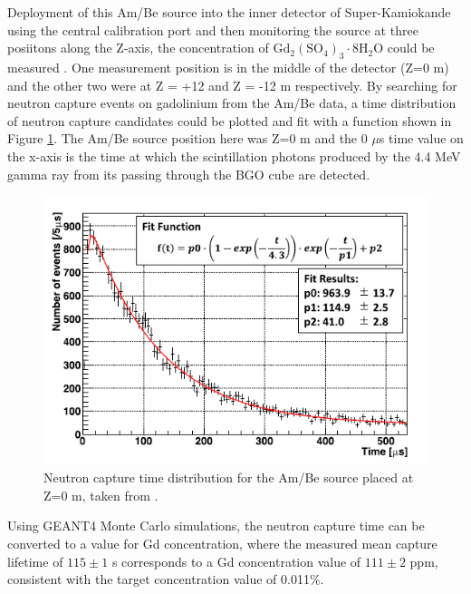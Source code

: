 Deployment of this Am/Be source into the inner detector of Super-Kamiokande using the central calibration port and then monitoring the source at three posiitons along the Z-axis, the concentration of $\mathrm{Gd}_{2}\left(\mathrm{SO}_{4}\right)_{3} \cdot 8 \mathrm{H}_{2} \mathrm{O}$ could be measured \cite{pronost2017looking}. One measurement position is in the middle of the detector (Z=0 m) and the other two were at Z = +12 and Z = -12 m respectively. By searching for neutron capture events on gadolinium from the Am/Be data, a time distribution of neutron capture candidates could be plotted and fit with a function shown in Figure \ref{fig:ambe_time}. The Am/Be source position here was Z=0 m and the 0 $\mu$s time value on the x-axis is the time at which the scintillation photons produced by the 4.4 MeV gamma ray from its passing through the BGO cube are detected. 


\begin{figure}
    \includegraphics[width=\textwidth]{Figures/ambe_time.png}
    \caption{Neutron capture time distribution for the Am/Be source placed at Z=0 m, taken from \cite{abe_first_2021}.}
    \label{fig:ambe_time}
\end{figure}

Using GEANT4 Monte Carlo simulations, the neutron capture time can be converted to a value for Gd concentration, where the measured mean capture lifetime of $115 \pm 1$ \micro s corresponds to a Gd concentration value of $111 \pm 2$ ppm, consistent with the target concentration value of 0.011\%.


